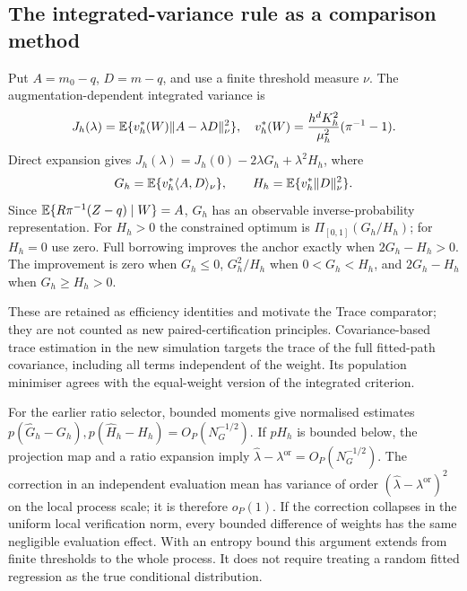 \subsection{The integrated-variance rule as a comparison method}
Put $A=m_0-q$, $D=m-q$, and use a finite threshold measure $\nu$. The augmentation-dependent integrated variance is
\[
 J_h(\lambda)=\mathbb E\{v_h^*(W)\|A-\lambda D\|_\nu^2\},\quad
 v_h^*(W)=\frac{h^dK_h^2}{\mu_h^2}(\pi^{-1}-1).
\]
Direct expansion gives $J_h(\lambda)=J_h(0)-2\lambda G_h+\lambda^2H_h$, where
\[
 G_h=\mathbb E\{v_h^*\langle A,D\rangle_\nu\},\qquad
 H_h=\mathbb E\{v_h^*\|D\|_\nu^2\}.
\]
Since $\mathbb E\{R\pi^{-1}(Z-q)\mid W\}=A$, $G_h$ has an observable inverse-probability representation. For $H_h>0$ the constrained optimum is $\Pi_{[0,1]}(G_h/H_h)$; for $H_h=0$ use zero. Full borrowing improves the anchor exactly when $2G_h-H_h>0$. The improvement is zero when $G_h\leq0$, $G_h^2/H_h$ when $0<G_h<H_h$, and $2G_h-H_h$ when $G_h\geq H_h>0$.

These are retained as efficiency identities and motivate the Trace comparator; they are not counted as new paired-certification principles. Covariance-based trace estimation in the new simulation targets the trace of the full fitted-path covariance, including all terms independent of the weight. Its population minimiser agrees with the equal-weight version of the integrated criterion.

For the earlier ratio selector, bounded moments give normalised estimates $p(\widehat G_h-G_h),p(\widehat H_h-H_h)=O_P(N_G^{-1/2})$. If $pH_h$ is bounded below, the projection map and a ratio expansion imply $\widehat\lambda-\lambda^{\mathrm{or}}=O_P(N_G^{-1/2})$. The correction in an independent evaluation mean has variance of order $(\widehat\lambda-\lambda^{\mathrm{or}})^2$ on the local process scale; it is therefore $o_P(1)$. If the correction collapses in the uniform local verification norm, every bounded difference of weights has the same negligible evaluation effect. With an entropy bound this argument extends from finite thresholds to the whole process. It does not require treating a random fitted regression as the true conditional distribution.

